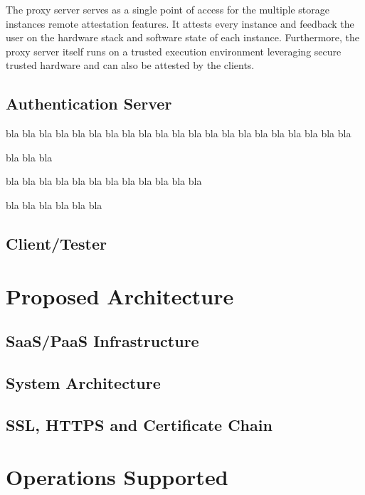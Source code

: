 The proxy server serves as a single point of access for the multiple storage instances remote attestation features. It attests every instance and feedback the user on the hardware stack and software state of each instance. Furthermore, the proxy server itself runs on a trusted execution environment leveraging secure trusted hardware and can also be attested by the clients.

\subsection{Authentication Server}
\label{ssec:authentication_server}

bla bla bla
bla bla bla
bla bla bla
bla bla bla
bla bla bla
bla bla bla
bla bla bla

bla bla bla

bla bla bla
bla bla bla
bla bla bla
bla bla bla

bla bla bla
bla bla bla

\subsection{Client/Tester}
\label{ssec:clienttester}


\section{Proposed Architecture} %
\label{sec:proposed_architecture}

\subsection{SaaS/PaaS Infrastructure}
\label{ssec:saas_pass_infrastructure}

\subsection{System Architecture}
\label{ssec:system_architecture}

\subsection{SSL, HTTPS and Certificate Chain}
\label{ssec:ssl_https_certificate_chain}

\section{Operations Supported} %
\label{sec:operations_supported}

